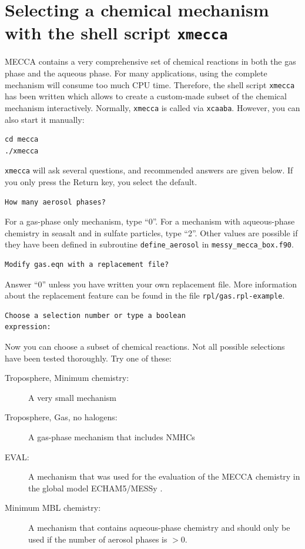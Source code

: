 \documentclass[twoside]{article}
\begin{document}
\section{Selecting a chemical mechanism with the shell script {\tt xmecca}}
\label{sec:xmecca}

MECCA contains a very comprehensive set of chemical reactions in both
the gas phase and the aqueous phase. For many applications, using the
complete mechanism will consume too much CPU time. Therefore, the shell
script \verb|xmecca| has been written which allows to create a
custom-made subset of the chemical mechanism interactively. Normally,
\verb|xmecca| is called via \verb|xcaaba|. However, you can also start
it manually:
\begin{verbatim}
cd mecca
./xmecca
\end{verbatim}
\verb|xmecca| will ask several questions, and recommended answers are
given below. If you only press the Return key, you select the default.
\begin{verbatim}
How many aerosol phases?
\end{verbatim}
For a gas-phase only mechanism, type ``0''. For a mechanism with
aqueous-phase chemistry in seasalt and in sulfate particles, type ``2''.
Other values are possible if they have been defined in subroutine
\verb|define_aerosol| in \verb|messy_mecca_box.f90|.
\begin{verbatim}
Modify gas.eqn with a replacement file?
\end{verbatim}
Answer ``0'' unless you have written your own replacement file. More
information about the replacement feature can be found in the file
\verb|rpl/gas.rpl-example|.
\begin{verbatim}
Choose a selection number or type a boolean
expression:
\end{verbatim}
Now you can choose a subset of chemical reactions. Not all possible
selections have been tested thoroughly. Try one of these:
\begin{description}
\item [Troposphere, Minimum chemistry:] A very small mechanism
\item [Troposphere, Gas, no halogens:] A gas-phase mechanism that
  includes NMHCs
\item [EVAL:] A mechanism that was used for the evaluation of the MECCA
  chemistry in the global model ECHAM5/MESSy \citep{1851}.
\item [Minimum MBL chemistry:] A mechanism that contains aqueous-phase
  chemistry and should only be used if the number of aerosol phases is
  $>0$.
\end{description}
\end{document}
